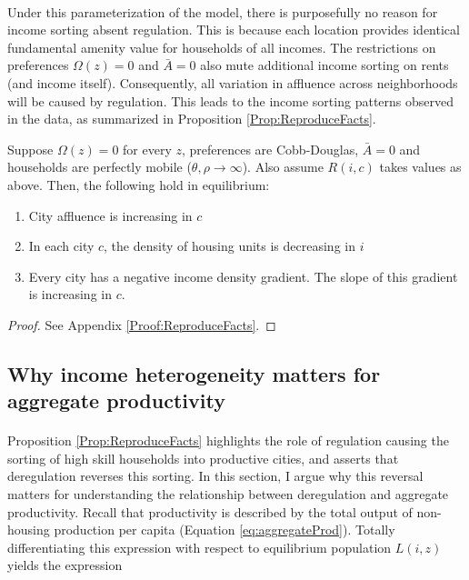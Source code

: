 \documentclass[12pt]{article}
\begin{document}
	\paragraph*{}
	Under this parameterization of the model, there is purposefully no reason for income sorting absent regulation. This is because each location provides identical fundamental amenity value for households of all incomes. The restrictions on preferences $\Omega(z) = 0$ and $\bar{A} = 0$ also mute additional income sorting on rents (and income itself).  Consequently, all variation in affluence across neighborhoods will be caused by regulation. This leads to the income sorting patterns observed in the data, as summarized in Proposition \ref{Prop:ReproduceFacts}.
	\begin{Proposition}\label{Prop:ReproduceFacts}
	Suppose $\Omega(z) = 0$ for every $z$, preferences are Cobb-Douglas, $\bar{A} = 0$ and households are perfectly mobile ($\theta, \rho \to \infty$). Also assume $R(i, c)$ takes values as above. Then, the following hold in equilibrium:
	
		\begin{enumerate}
			\item City affluence is increasing in $c$
		
			\item In each city $c$, the density of housing units is decreasing in $i$ 
		
			\item Every city has a negative income density gradient. The slope of this gradient is increasing in $c$.
		\end{enumerate}
	
	\end{Proposition}
	\begin{proof}
		See Appendix \ref{Proof:ReproduceFacts}.
	\end{proof}
	
	
	
\subsection{Why income heterogeneity matters for aggregate productivity}
\paragraph*{}
Proposition \ref{Prop:ReproduceFacts} highlights the role of regulation causing the sorting of high skill households into productive cities, and asserts that deregulation reverses this sorting. In this section, I argue why this reversal matters for understanding the relationship between deregulation and aggregate productivity. Recall that productivity is described by the total output of non-housing production per capita (Equation \ref{eq:aggregateProd}). Totally differentiating this expression with respect to equilibrium population $L(i, z)$ yields the expression
\end{document}
